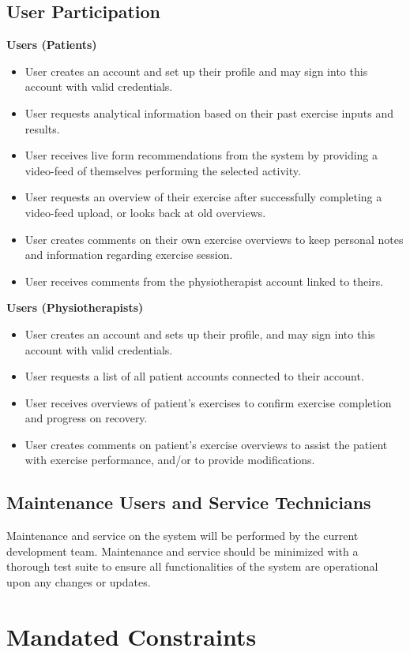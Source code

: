 \documentclass[12pt]{article}
\begin{document}
\subsection{User Participation}
\textbf{Users (Patients)}
\begin{itemize}
  \item User creates an account and set up their profile and may sign into this account with valid credentials.
  \item User requests analytical information based on their past exercise inputs and results.
  \item User receives live form recommendations from the system by providing a video-feed of themselves performing the selected activity.
  \item User requests an overview of their exercise after successfully completing a video-feed upload, or looks back at old overviews.
  \item User creates comments on their own exercise overviews to keep personal notes and information regarding exercise session.
  \item User receives comments from the physiotherapist account linked to theirs.
\end{itemize}
\textbf{Users (Physiotherapists)}
\begin{itemize}
  \item User creates an account and sets up their profile, and may sign into this account with valid credentials.
  \item User requests a list of all patient accounts connected to their account.
  \item User receives overviews of patient’s exercises to confirm exercise completion and progress on recovery.
  \item User creates comments on patient’s exercise overviews to assist the patient with exercise performance, and/or to provide modifications.
\end{itemize}
\subsection{Maintenance Users and Service Technicians}
Maintenance and service on the system will be performed by the current development team. Maintenance and service should be minimized with a thorough test suite to ensure all functionalities of the system are operational upon any changes or updates.

\section{Mandated Constraints}
\end{document}
